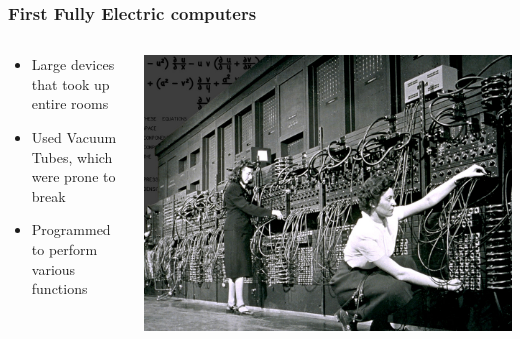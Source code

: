 \documentclass{beamer}
\begin{document}
\begin{frame}
    \frametitle{First Fully Electric computers}
    \begin{columns}
        \begin{column}{0.6\linewidth}
            \begin{itemize}
                \item<1-> Large devices that took up entire rooms
                \item<2-> Used Vacuum Tubes, which were prone to break
                \item<3-> Programmed to perform various functions 
            \end{itemize}
        \end{column}
        \begin{column}{0.4\linewidth}
            \centering
            \includegraphics[width=\linewidth]{eniac.jpg}
        \end{column}
    \end{columns} 
\end{frame}
\end{document}
